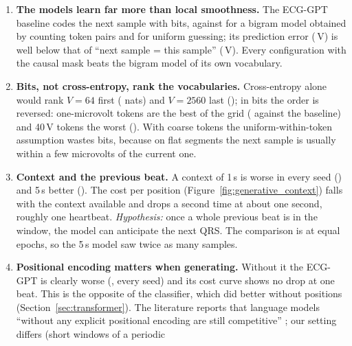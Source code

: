 

\begin{enumerate}[leftmargin=1.4em,itemsep=2pt]
  \item \textbf{The models learn far more than local smoothness.} The ECG-GPT baseline codes the next
        sample with \generativeBitsMeanBase{} bits, against \generativeBigramBitsVTwoFiveSix{} for a bigram
        model obtained by counting token pairs and \generativeUniformBits{} for uniform guessing; its
        prediction error (\generativeRmseUvMeanBase{}\,\textmu V) is well below that of ``next sample =
        this sample'' (\generativePersistenceRmseUv{}\,\textmu V). Every configuration with the causal
        mask beats the bigram model of its own vocabulary.
  \item \textbf{Bits, not cross-entropy, rank the vocabularies.} Cross-entropy alone would rank $V = 64$
        first (\generativeCeMeanVocabSixFour{} nats) and $V = 2560$ last (\generativeCeMeanVocabTwoFiveSixZero{});
        in bits the order is reversed: one-microvolt tokens are the best of the grid
        (\generativeDiffMeanVocabTwoFiveSixZero{} against the baseline) and 40\,\textmu V tokens the worst
        (\generativeDiffMeanVocabSixFour{}). With coarse tokens the uniform-within-token assumption
        wastes bits, because on flat segments the next sample is usually within a few microvolts of the
        current one.
  \item \textbf{Context and the previous beat.} A context of 1\,s is worse in every seed
        (\generativeDiffMeanCtxOneZeroZero{}) and 5\,s better (\generativeDiffMeanCtxFiveZeroZero{}).
        The cost per position (Figure~\ref{fig:generative_context}) falls with the context available and
        drops a second time at about one second, roughly one heartbeat. \emph{Hypothesis:} once a whole
        previous beat is in the window, the model can anticipate the next QRS. The comparison is at equal
        epochs, so the 5\,s model saw twice as many samples.
  \item \textbf{Positional encoding matters when generating.} Without it the ECG-GPT is clearly worse
        (\generativeDiffMeanNoPos{}, every seed) and its cost curve shows no drop at one beat. This is the
        opposite of the classifier, which did better without positions (Section~\ref{sec:transformer}).
        The literature reports that language models ``without any explicit positional encoding are still
        competitive'' \cite[p.~1]{haviv2022transformer}; our setting differs (short windows of a periodic

\end{enumerate}
